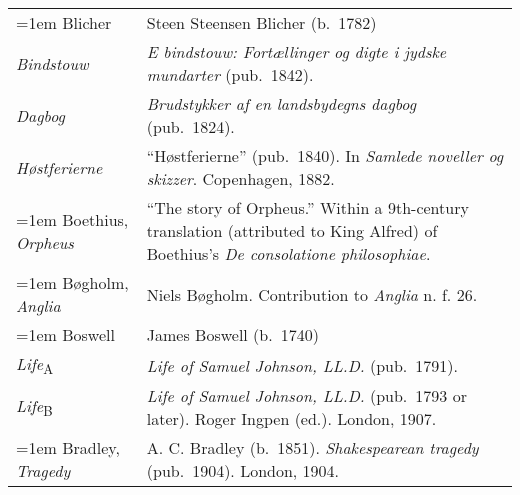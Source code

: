 \begin{xltabular}{\textwidth}{ lQ }
\hangindent=1em  Blicher & Steen Steensen Blicher (b.~1782) \\
\hspace{1em}\textit{Bindstouw} & \textit{E bindstouw: Fortællinger og digte i jydske mundarter} (pub.~1842). \\
\hspace{1em}\textit{Dagbog} & \textit{Brudstykker af en landsbydegns dagbog} (pub.~1824). \\ %
\hspace{1em}\textit{Høstferierne} & ``Høstferierne'' (pub.~1840). In \textit{Samlede noveller og skizzer}. Copenhagen, 1882. \\ %

\hangindent=1em  Boethius, \textit{Orpheus} & ``The story of Orpheus.'' Within a 9th-century translation (attributed to King Alfred) of Boethius's \textit{De consolatione philosophiae}. \\

\hangindent=1em  Bøgholm, \textit{Anglia} & Niels Bøgholm. Contribution to \textit{Anglia} n. f. 26. \\ %

\hangindent=1em  Boswell & James Boswell (b.~1740) \\
\hspace{1em}\textit{Life}\textsubscript{A} & \textit{Life of Samuel Johnson, LL.D.} (pub.~1791).\\
\hspace{1em}\textit{Life}\textsubscript{B} & \textit{Life of Samuel Johnson, LL.D.} (pub.~1793 or later). Roger Ingpen (ed.). London, 1907.\\ %

\hangindent=1em  Bradley, \textit{Tragedy} & A. C. Bradley (b.~1851). \textit{Shakespearean tragedy} (pub.~1904). London, 1904. \\


\end{xltabular}
